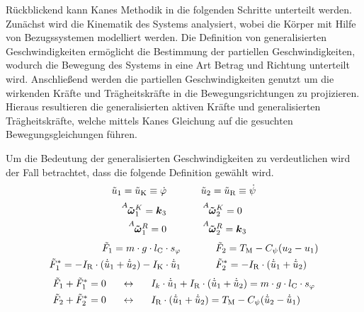 Rückblickend kann Kanes Methodik in die folgenden Schritte unterteilt werden. Zunächst wird die Kinematik des Systems analysiert, wobei die Körper mit Hilfe von Bezugssystemen modelliert werden. Die Definition von generalisierten Geschwindigkeiten ermöglicht die Bestimmung der partiellen Geschwindigkeiten, wodurch die Bewegung des Systems in eine Art Betrag und Richtung unterteilt wird. Anschließend werden die partiellen Geschwindigkeiten genutzt um die wirkenden Kräfte und Trägheitskräfte in die Bewegungsrichtungen zu projizieren. Hieraus resultieren die generalisierten aktiven Kräfte und generalisierten Trägheitskräfte, welche mittels Kanes Gleichung auf die gesuchten Bewegungsgleichungen führen.

Um die Bedeutung der generalisierten Geschwindigkeiten zu verdeutlichen wird der Fall betrachtet, dass die folgende Definition gewählt wird.
\begin{equation}
\tilde{u}_{\text{1}} = \tilde{u}_{\text{K}} \equiv \dot{\varphi} \hspace{35pt} \tilde{u}_{\text{2}} = \tilde{u}_{\text{R}} \equiv \dot{\psi}
\end{equation}
\begin{equation}
\begin{split}
\vel{A}{\tilde{\omega}}{K}\idx{1} = \bs{k}\idx{3} &\hspace{35pt} \vel{A}{\tilde{\omega}}{K}\idx{2} = 0
\\
\vel{A}{\tilde{\omega}}{R}\idx{1} = 0 &\hspace{35pt} \vel{A}{\tilde{\omega}}{R}\idx{2} = \bs{k}\idx{3}
\end{split}
\end{equation}
\begin{equation}
\begin{split}
\tilde{F}_{\text{1}} = m\cdot g\cdot l_{\text{C}}\cdot s_{\varphi} &\hspace{35pt} \tilde{F}_{\text{2}} = T_{\text{M}} - C_{\psi}(u_{\text{2}}-u_{\text{1}}) 
\\
\tilde{F}^*_{\text{1}} = -I_{\text{R}}\cdot (\dot{\tilde{u}}_{\text{1}} + \dot{\tilde{u}}_{\text{2}}) - I_{\text{K}}\cdot \dot{\tilde{u}}_{\text{1}} &\hspace{35pt} \tilde{F}^*_{\text{2}} = -I_{\text{R}}\cdot (\dot{\tilde{u}}_{\text{1}} + \dot{\tilde{u}}_{\text{2}})
\end{split}
\end{equation}
\begin{align}
\tilde{F}_{\text{1}} + \tilde{F}^*_{\text{1}} = 0 &\hspace{15pt}\leftrightarrow\hspace{15pt} I_k\cdot \dot{\tilde{u}}_{\text{1}} + I_{\text{R}}\cdot (\dot{\tilde{u}}_{\text{1}}+\dot{\tilde{u}}_{\text{2}}) = m\cdot g\cdot l_{\text{C}}\cdot s_{\varphi} \label{tilde_bwg_1}
\\
\tilde{F}_{\text{2}} + \tilde{F}^*_{\text{2}} = 0 &\hspace{15pt}\leftrightarrow\hspace{15pt} I_{\text{R}}\cdot (\dot{\tilde{u}}_{\text{1}}+\dot{\tilde{u}}_{\text{2}}) = T_{\text{M}} - C_{\psi}(\dot{\tilde{u}}_{\text{2}} - \dot{\tilde{u}}_{\text{1}}) \label{tilde_bwg_2}
\end{align}
